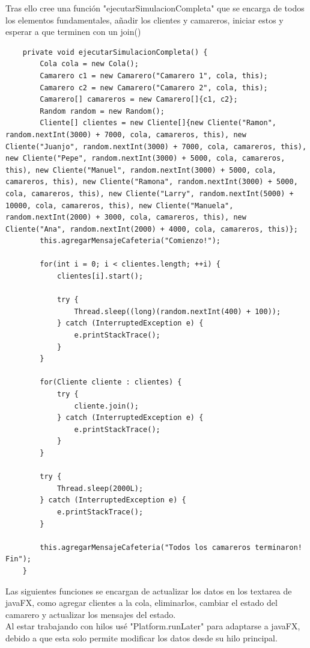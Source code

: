 \documentclass{article}
\begin{document}
Tras ello cree una función "ejecutarSimulacionCompleta" que se encarga de todos los elementos fundamentales, añadir  los clientes y camareros,
iniciar estos y esperar a que terminen con un join()
\begin{lstlisting}
    private void ejecutarSimulacionCompleta() {
        Cola cola = new Cola();
        Camarero c1 = new Camarero("Camarero 1", cola, this);
        Camarero c2 = new Camarero("Camarero 2", cola, this);
        Camarero[] camareros = new Camarero[]{c1, c2};
        Random random = new Random();
        Cliente[] clientes = new Cliente[]{new Cliente("Ramon", random.nextInt(3000) + 7000, cola, camareros, this), new Cliente("Juanjo", random.nextInt(3000) + 7000, cola, camareros, this), new Cliente("Pepe", random.nextInt(3000) + 5000, cola, camareros, this), new Cliente("Manuel", random.nextInt(3000) + 5000, cola, camareros, this), new Cliente("Ramona", random.nextInt(3000) + 5000, cola, camareros, this), new Cliente("Larry", random.nextInt(5000) + 10000, cola, camareros, this), new Cliente("Manuela", random.nextInt(2000) + 3000, cola, camareros, this), new Cliente("Ana", random.nextInt(2000) + 4000, cola, camareros, this)};
        this.agregarMensajeCafeteria("Comienzo!");

        for(int i = 0; i < clientes.length; ++i) {
            clientes[i].start();

            try {
                Thread.sleep((long)(random.nextInt(400) + 100));
            } catch (InterruptedException e) {
                e.printStackTrace();
            }
        }

        for(Cliente cliente : clientes) {
            try {
                cliente.join();
            } catch (InterruptedException e) {
                e.printStackTrace();
            }
        }

        try {
            Thread.sleep(2000L);
        } catch (InterruptedException e) {
            e.printStackTrace();
        }

        this.agregarMensajeCafeteria("Todos los camareros terminaron! Fin");
    }
\end{lstlisting}
Las siguientes funciones se encargan de actualizar los datos en los textarea de javaFX, como agregar clientes a la cola, eliminarlos, cambiar el estado del camarero y actualizar los mensajes del estado.\\
Al estar trabajando con hilos usé "Platform.runLater" para adaptarse a javaFX, debido a que esta solo permite modificar los datos desde su hilo principal.
\end{document}
